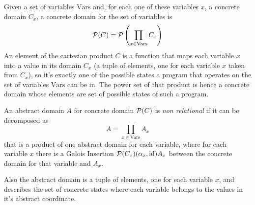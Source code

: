 Given a set of variables $\text{Vars}$ and, for each one of these variables $x$, a concrete domain $C_x$, a concrete domain for the set of variables is
\[
\mathcal{P}(C) = \mathcal{P}\left(\prod\limits_{x \in \text{Vars}} C_x \right)
\]
An element of the cartesian product $C$ is a function that maps each variable $x$ into a value in its domain $C_x$ (a tuple of elements, one for each variable $x$ taken from $C_x$), so it's exactly one of the possible states a program that operates on the set of variables $\text{Vars}$ can be in. The power set of that product is hence a concrete domain whose elements are set of possible states of such a program.

\begin{definition}
	An abstract domain $A$ for concrete domain $\mathcal{P}(C)$ is \textit{non relational} if it can be decomposed as
	\[
	A = \prod\limits_{x \in \text{Vars}} A_x
	\]
	that is a product of one abstract domain for each variable, where for each variable $x$ there is a Galois Insertion $\mathcal{P}(C_x) (\alpha_x, \text{id}) A_x$ between the concrete domain for that variable and $A_x$.
\end{definition}

Also the abstract domain is a tuple of elements, one for each variable $x$, and describes the set of concrete states where each variable belongs to the values in it's abstract coordinate.

